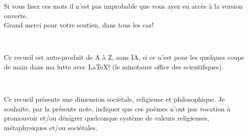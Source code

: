 \begin{center}
    \vspace*{\fill}
    \begin{minipage}{0.8\linewidth}


    \centering
    Si vous lisez ces mots il n'est pas improbable
    que vous ayez eu accès à la version ouverte.
    \\
    Grand merci pour votre soutien, dans tous les cas!

    ~\par
    
    Ce recueil est auto-produit de A à Z,
    sans IA, si ce n'est pour les quelques coups
    de main dans ma lutte avec \LaTeX{}!
    (le \og{}minotaure office\fg{} des scientifiques).

    ~\par

    Ce recueil présente une dimension sociétale, religieuse et philosophique.
    Je souhaite, par la présente note, indiquer que ces poèmes n'ont
    pas vocation à promouvoir et/ou dénigrer quelconque système de valeurs
    religieuses, métaphysiques et/ou sociétales.
    
    \end{minipage}
    \vspace*{\fill}
\end{center}
\else
\fi

\newpage
\fi
